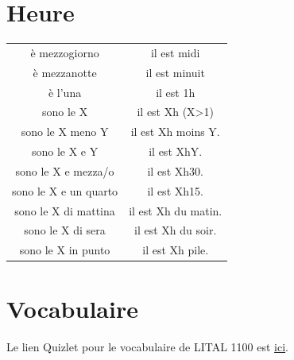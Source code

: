 \documentclass[12pt, openany]{report}
\begin{document}
\section{Heure}
\begin{center}
    \begin{tabular}{c|c}
        è mezzogiorno  & il est midi\\
        è mezzanotte & il est minuit\\
        è l'una & il est 1h\\
        sono le X & il est Xh (X>1)\\
        sono le X meno Y & il est Xh moins Y.\\
        sono le X e Y & il est XhY.\\
        sono le X e mezza/o & il est Xh30.\\
        sono le X e un quarto & il est Xh15.\\
        sono le X di mattina & il est Xh du matin.\\
        sono le X di sera & il est Xh du soir.\\
        sono le X in punto & il est Xh pile.\\
    \end{tabular}
\end{center}
\section{Vocabulaire}
Le lien Quizlet pour le vocabulaire de LITAL 1100 est \hyperlink{https://quizlet.com/be/1006471421/lital1100-q2-flash-cards/}{ici}.
\end{document}
